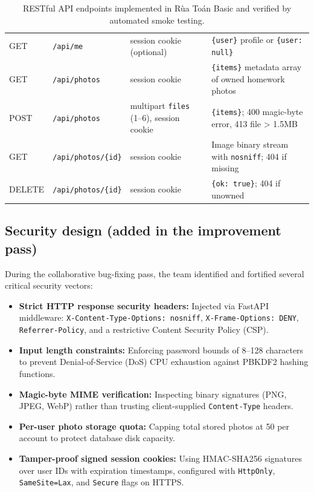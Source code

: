 \begin{table}[ht]
\begin{tabularx}{\textwidth}{@{}l l >{\raggedright\arraybackslash}X >{\raggedright\arraybackslash}X@{}}
GET & \texttt{/api/me} & session cookie (optional) & \texttt{\{user\}} profile or \texttt{\{user: null\}}\\
GET & \texttt{/api/photos} & session cookie & \texttt{\{items\}} metadata array of owned homework photos\\
POST & \texttt{/api/photos} & multipart \texttt{files} (1--6), session cookie & \texttt{\{items\}}; 400 magic-byte error, 413 file > 1.5MB\\
GET & \texttt{/api/photos/\{id\}} & session cookie & Image binary stream with \texttt{nosniff}; 404 if missing\\
DELETE & \texttt{/api/photos/\{id\}} & session cookie & \texttt{\{ok: true\}}; 404 if unowned\\
\bottomrule
\end{tabularx}
\caption{RESTful API endpoints implemented in Rùa Toán Basic and verified by automated smoke testing.}
\label{tab:api}
\end{table}

\subsection{Security design (added in the improvement pass)}\label{sec:security}
During the collaborative bug-fixing pass, the team identified and fortified several critical security vectors:
\begin{itemize}
  \item \textbf{Strict HTTP response security headers:} Injected via FastAPI middleware:
        \texttt{X-Content-Type-Options: nosniff}, \texttt{X-Frame-Options: DENY},
        \texttt{Referrer-Policy}, and a restrictive Content Security Policy (CSP).
  \item \textbf{Input length constraints:} Enforcing password bounds of 8--128 characters to prevent Denial-of-Service
        (DoS) CPU exhaustion against PBKDF2 hashing functions.
  \item \textbf{Magic-byte MIME verification:} Inspecting binary signatures (PNG, JPEG, WebP) rather than trusting
        client-supplied \texttt{Content-Type} headers.
  \item \textbf{Per-user photo storage quota:} Capping total stored photos at 50 per account to protect database disk capacity.
  \item \textbf{Tamper-proof signed session cookies:} Using HMAC-SHA256 signatures over user IDs with expiration
        timestamps, configured with \texttt{HttpOnly}, \texttt{SameSite=Lax}, and \texttt{Secure} flags on HTTPS.
\end{itemize}
